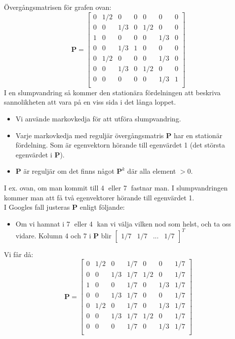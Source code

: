 Övergångsmatrisen för grafen ovan:
\[
\mathbf{P} = 
   	\begin{bmatrix}
   		0 & 1/2 & 0 & 0 & 0 & 0 & 0 \\
   		0 & 0 & 1/3 & 0 & 1/2 & 0 & 0 \\
   		1 & 0 & 0 & 0 & 0 & 1/3 & 0 \\
   		0 & 0 & 1/3 & 1 & 0 & 0 & 0 \\
   		0 & 1/2 & 0 & 0 & 0 & 1/3 & 0 \\
   		0 & 0 & 1/3 & 0 & 1/2 & 0 & 0 \\
   		0 & 0 & 0 & 0 & 0 & 1/3 & 1 \\
   	\end{bmatrix}
\]
I en slumpvandring så kommer den stationära fördelningen att beskriva sannolikheten att vara på en viss sida i det långa loppet.
\begin{itemize}
	\item Vi använde markovkedja för att utföra slumpvandring.
	\item Varje markovkedja med reguljär övergångsmatris \textbf{P} har en stationär fördelning. Som är egenvektorn hörande till egenvärdet 1 (det största egenvärdet i \textbf{P}).
	\item \textbf{P} är reguljär om det finns något $\mathbf{P}^k$ där alla element $>0$.
\end{itemize}
I ex. ovan, om man kommit till \textcircled{4} eller \textcircled{7} fastnar man. I slumpvandringen kommer man att få två egenvektorer hörande till egenvärdet 1.\\
I Googles fall justeras \textbf{P} enligt följande:
\begin{itemize}
	\item Om vi hamnat i \textcircled{7} eller \textcircled{4} kan vi välja vilken nod som helst, och ta oss vidare. Kolumn 4 och 7 i \textbf{P} blir $\begin{bmatrix} 1/7 & 1/7 & ... & 1/7 \end{bmatrix}^{T}$
\end{itemize}
Vi får då:
\[
\mathbf{P} = 
   	\begin{bmatrix}
   		0 & 1/2 & 0 & 1/7 & 0 & 0 & 1/7 \\
   		0 & 0 & 1/3 & 1/7 & 1/2 & 0 & 1/7 \\
   		1 & 0 & 0 & 1/7 & 0 & 1/3 & 1/7 \\
   		0 & 0 & 1/3 & 1/7 & 0 & 0 & 1/7 \\
   		0 & 1/2 & 0 & 1/7 & 0 & 1/3 & 1/7 \\
   		0 & 0 & 1/3 & 1/7 & 1/2 & 0 & 1/7 \\
   		0 & 0 & 0 & 1/7 & 0 & 1/3 & 1/7 \\
   	\end{bmatrix}
\]
